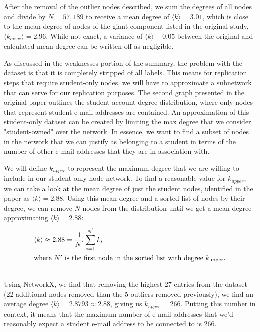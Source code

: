 \documentclass[11pt]{article}
\begin{document}
\begin{multicols}{2}
After the removal of the outlier nodes described, we sum the degrees of all nodes and divide by \(N = 57,189\) to receive a mean degree of \(\langle k \rangle=3.01\), which is close to the mean degree of nodes of the giant component listed in the original study, \(\langle k_{large} \rangle = 2.96\). While not exact, a variance of \(\langle k \rangle \pm 0.05\)  between the original and calculated mean degree can be written off as negligible. 

As discussed in the weaknesses portion of the summary, the problem with the dataset is that it is completely stripped of all labels. This means for replication steps that require student-only nodes, we will have to approximate a subnetwork that can serve for our replication purposes. The second graph presented in the original paper outlines the student account degree distribution, where only nodes that represent student e-mail addresses are contained. An approximation of this student-only dataset can be created by limiting the max degree that we consider "student-owned" over the network. In essence, we want to find a subset of nodes in the network that we can justify as belonging to a student in terms of the number of other e-mail addresses that they are in association with. 

We will define \(k_{upper}\) to represent the maximum degree that we are willing to include in our student-only node network. To find a reasonable value for \(k_{upper}\), we can take a look at the mean degree of just the student nodes, identified in the paper as \(\langle k \rangle =2.88\). Using this mean degree and a sorted list of nodes by their degree, we can remove \(N\) nodes from the distribution until we get a mean degree approximating \(\langle k \rangle =2.88\):
\begin{align}
\langle k \rangle \approx 2.88 = \frac{1}{N^{'}} \sum_{i=1}^{N^{'}} k_i \\
\intertext{where $N'$ is the first node in the sorted list with degree $k_{\text{upper}}$.}\notag 
\end{align} 
\hspace*{\parindent}Using NetworkX, we find that removing the highest 27 entries from the dataset (22 additional nodes removed than the 5 outliers removed previously), we find an average degree \(\langle k \rangle = 2.8793 \approx 2.88\), giving us \(k_{upper} = 266\). Putting this number in context, it means that the maximum number of e-mail addresses that we'd reasonably expect a student e-mail address to be connected to is 266. 


\end{multicols}
\end{document}
